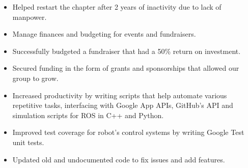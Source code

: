 




\begin{itemize}
  \item Helped restart the chapter after 2 years of inactivity due to lack of manpower.
  \item Manage finances and budgeting for events and fundraisers.
  \item Successfully budgeted a fundraiser that had a 50\% return on investment.
  \item Secured funding in the form of grants and sponsorships that allowed our group to grow.
\end{itemize}
\divider\small

\begin{itemize}
  \item Increased productivity by writing scripts that help automate various repetitive tasks, interfacing with Google App APIs, GitHub’s API and simulation scripts for ROS in C++ and Python.
  \item Improved test coverage for robot’s control systems by writing Google Test unit tests.
  \item Updated old and undocumented code to fix issues and add features.
\end{itemize}
\divider\small
